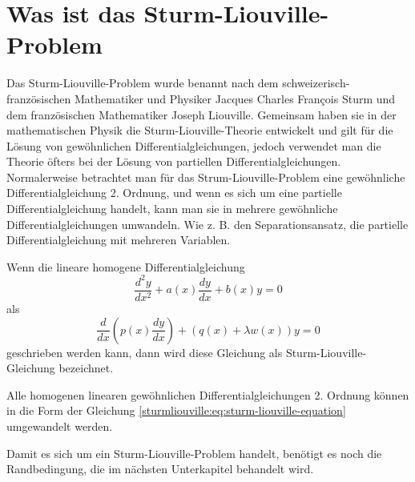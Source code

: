 %
%
%

%

\section{Was ist das Sturm-Liouville-Problem\label{sturmliouville:section:teil0}}
Das Sturm-Liouville-Problem wurde benannt nach dem schweizerisch-französischen
Mathematiker und Physiker Jacques Charles Fran\c{c}ois Sturm und dem
französischen Mathematiker Joseph Liouville.
Gemeinsam haben sie in der mathematischen Physik die Sturm-Liouville-Theorie
entwickelt und gilt für die Lösung von gewöhnlichen Differentialgleichungen,
jedoch verwendet man die Theorie öfters bei der Lösung von partiellen
Differentialgleichungen.
Normalerweise betrachtet man für das Strum-Liouville-Problem eine gewöhnliche
Differentialgleichung 2. Ordnung, und wenn es sich um eine partielle
Differentialgleichung handelt, kann man sie in mehrere gewöhnliche
Differentialgleichungen umwandeln. Wie z. B. den Separationsansatz, die
partielle Differentialgleichung mit mehreren Variablen.

\begin{definition}
Wenn die lineare homogene Differentialgleichung
\[
	\frac{d^2y}{dx^2} + a(x)\frac{dy}{dx} + b(x)y = 0
\]
als
\begin{equation}
	\label{sturmliouville:eq:sturm-liouville-equation}
	\frac{d}{dx} (p(x) \frac{dy}{dx}) + (q(x) +
	\lambda w(x)) y
	=
	0 
\end{equation}
geschrieben werden kann, dann wird diese Gleichung als Sturm-Liouville-Gleichung
bezeichnet.
\end{definition}
Alle homogenen linearen gewöhnlichen Differentialgleichungen 2. Ordnung können
in die Form der Gleichung \eqref{sturmliouville:eq:sturm-liouville-equation} 
umgewandelt werden.

Damit es sich um ein Sturm-Liouville-Problem handelt, benötigt es noch die
Randbedingung, die im nächsten Unterkapitel behandelt wird. 

